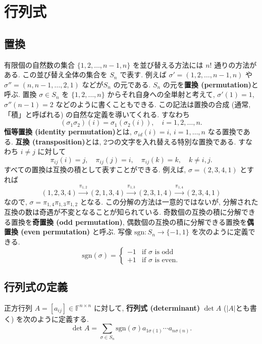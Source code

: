 \documentclass[a4paper]{scrbook}
\theoremstyle{definition}
\begin{document}
\section{行列式}

\subsection{置換}

有限個の自然数の集合 \(\{1,2,\dots,n-1,n\}\) を並び替える方法には \(n!\)
通りの方法がある. この並び替え全体の集合を \(S_n\) で表す. 例えば
\(\sigma'=(1,2,\dots,n-1,n)\) や \(\sigma''=(n,n-1,\dots,2,1)\)
などが\(S_{n}\) の元である. \(S_{n}\) の元を\textbf{置換
(permutation)}と呼ぶ. 置換 \(\sigma\in S_{n}\) を \(\{1,2,\dots,n\}\)
からそれ自身への全単射と考えて, \(\sigma'(1)=1\), \(\sigma''(n-1)=2\)
などのように書くこともできる. この記法は置換の合成 (通常,
「積」と呼ばれる) の自然な定義を導いてくれる. すなわち \[
(\sigma_{1}\sigma_{2})(i)=\sigma_{1}(\sigma_{2}(i)),\quad i=1,2,\dots,n.
\] \textbf{恒等置換 (identity permutation)}とは, \(\sigma_{id}(i)=i\),
\(i=1,\dots,n\) なる置換である. \textbf{互換 (transposition)}とは,
2つの文字を入れ替える特別な置換である. すなわち \(i\neq j\) に対して \[
\pi_{ij}(i)=j,\quad\pi_{ij}(j)=i,\quad\pi_{ij}(k)=k,\quad k\neq i,j.
\] すべての置換は互換の積として表すことができる. 例えば,
\(\sigma=(2,3,4,1)\) とすれば \[
(1,2,3,4)\xrightarrow{\pi_{1,2}}(2,1,3,4)\xrightarrow{\pi_{1,3}}(2,3,1,4)\xrightarrow{\pi_{1,4}}(2,3,4,1)
\] なので, \(\sigma=\pi_{1,4}\pi_{1,3}\pi_{1,2}\) となる.
この分解の方法は一意的ではないが,
分解された互換の数は奇遇が不変となることが知られている.
奇数個の互換の積に分解できる置換を\textbf{奇置換 (odd permutation)},
偶数個の互換の積に分解できる置換を\textbf{偶置換 (even permutation)}
と呼ぶ. 写像 \(\mathrm{sgn}:S_{n}\to\{-1,1\}\) を次のように定義できる.
\[
  \mathrm{sgn}(\sigma)=\begin{cases}
  -1 & \mbox{if }\sigma\mbox{ is odd}\\
  +1 & \mbox{if }\sigma\mbox{ is even}.
  \end{cases}
\]

\subsection{行列式の定義}

正方行列 \(A=[a_{ij}]\in\mathbb{F}^{n\times n}\) に対して,
\textbf{行列式 (determinant)} \(\det A\) (\(|A|\)とも書く)
を次のように定義する. \[
  \det A=\sum_{\sigma\in S_{n}}\mathrm{sgn}(\sigma)a_{1\sigma(1)}\cdots a_{n\sigma(n)}.
\]
\end{document}
